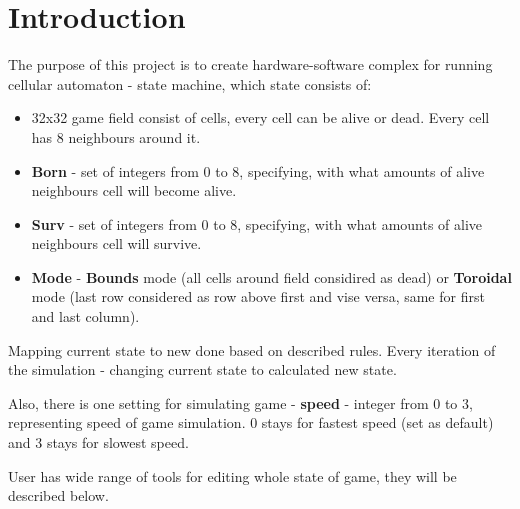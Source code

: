\chapter*{Introduction}

The purpose of this project is to create hardware-software complex for running cellular automaton - state machine, which state consists of:

\begin{itemize}
	\item 32x32 game field consist of cells, every cell can be alive or dead. Every cell has 8 neighbours around it.
	\item \textbf{Born} - set of integers from 0 to 8, specifying, with what amounts of alive neighbours cell will become alive.
	\item \textbf{Surv} - set of integers from 0 to 8, specifying, with what amounts of alive neighbours cell will survive.
	\item \textbf{Mode} - \textbf{Bounds} mode (all cells around field considired as dead) or \textbf{Toroidal} mode (last row considered as row above first and vise versa, same for first and last column).
\end{itemize}

Mapping current state to new done based on described rules. Every iteration of the simulation - changing current state to calculated new state.

Also, there is one setting for simulating game - \textbf{speed} - integer from 0 to 3, representing speed of game simulation. 0 stays for fastest speed (set as default) and 3 stays for slowest speed.

User has wide range of tools for editing whole state of game, they will be described below.
